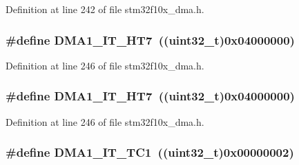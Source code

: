 Definition at line 242 of file stm32f10x\+\_\+dma.\+h.

\subsubsection[{\texorpdfstring{D\+M\+A1\+\_\+\+I\+T\+\_\+\+H\+T7}{DMA1_IT_HT7}}]{\setlength{\rightskip}{0pt plus 5cm}\#define D\+M\+A1\+\_\+\+I\+T\+\_\+\+H\+T7~(({\bf uint32\+\_\+t})0x04000000)}\hypertarget{group___d_m_a__interrupts__definition_ga9f8a6dd7fc4978c95cbd9de63c85bc37}{}\label{group___d_m_a__interrupts__definition_ga9f8a6dd7fc4978c95cbd9de63c85bc37}


Definition at line 246 of file stm32f10x\+\_\+dma.\+h.

\subsubsection[{\texorpdfstring{D\+M\+A1\+\_\+\+I\+T\+\_\+\+H\+T7}{DMA1_IT_HT7}}]{\setlength{\rightskip}{0pt plus 5cm}\#define D\+M\+A1\+\_\+\+I\+T\+\_\+\+H\+T7~(({\bf uint32\+\_\+t})0x04000000)}\hypertarget{group___d_m_a__interrupts__definition_ga9f8a6dd7fc4978c95cbd9de63c85bc37}{}\label{group___d_m_a__interrupts__definition_ga9f8a6dd7fc4978c95cbd9de63c85bc37}


Definition at line 246 of file stm32f10x\+\_\+dma.\+h.

\subsubsection[{\texorpdfstring{D\+M\+A1\+\_\+\+I\+T\+\_\+\+T\+C1}{DMA1_IT_TC1}}]{\setlength{\rightskip}{0pt plus 5cm}\#define D\+M\+A1\+\_\+\+I\+T\+\_\+\+T\+C1~(({\bf uint32\+\_\+t})0x00000002)}\hypertarget{group___d_m_a__interrupts__definition_ga783532083dcc6e9752feb2e982ce7426}{}\label{group___d_m_a__interrupts__definition_ga783532083dcc6e9752feb2e982ce7426}


